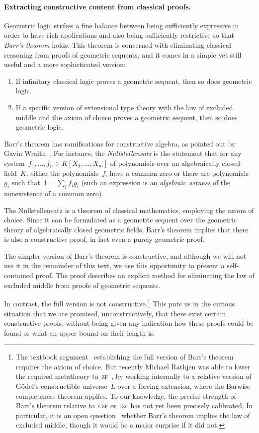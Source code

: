 \documentclass{ws-rv9x6}
\begin{document}
{\paragraph{Extracting constructive content from classical proofs.}\label{par:barr}
Geometric logic strikes a fine balance between being sufficiently expressive in order to
have rich applications and also being sufficiently restrictive so that \emph{Barr's
theorem} holds. This theorem is concerned with eliminating classical reasoning
from proofs of geometric sequents, and it comes in a simple yet still useful
and a more sophisticated version:
\begin{enumerate}
\item If infinitary classical logic proves a geometric sequent, then so does
geometric logic.
\item If a specific version of extensional type theory with the law of excluded
middle and the axiom of choice proves a geometric sequent, then so does
geometric logic.
\end{enumerate}
Barr's theorem has ramifications for constructive algebra, as pointed out by
Gavin Wraith~\cite{wraith:intuitionistic-algebra}.
For instance, the \emph{Nullstellensatz} is the statement that for any
system~$f_1,\ldots,f_n \in K[X_1,\ldots,X_m]$ of polynomials over an
algebraically closed field~$K$, either the polynomials~$f_i$ have a common zero
or there are polynomials~$g_i$ such that~$1 = \sum_i f_i g_i$ (such an
expression is an \emph{algebraic witness} of the nonexistence of a common
zero).

The Nullstellensatz is a theorem of classical mathematics, employing the
axiom of choice. Since it can be formulated as a geometric sequent over the
geometric theory of algebraically closed geometric fields, Barr's theorem
implies that there is also a constructive proof, in fact even a purely
geometric proof.

The simpler version of Barr's theorem is constructive, and although we will not
use it in the remainder of this text, we use this opportunity to present a
self-contained proof. The proof describes an explicit method for eliminating
the law of excluded middle from proofs of geometric sequents.

In contrast, the full version is not constructive.\footnote{%
The textbook argument~\cite[Theorem~7.57]{johnstone:topos-theory} establishing
the full version of Barr's theorem requires the axiom of choice. But recently
Michael Rathjen was able to lower the required metatheory
to~\textsc{zf}~\cite[Remark~4.2]{rathjen:barr}, by working internally to a
relative version of Gödel's constructible universe~$L$ over a forcing
extension, where the Barwise completeness theorem applies. To our knowledge,
the precise strength of Barr's theorem relative to~\textsc{czf} or~\textsc{izf}
has not yet been precisely calibrated. In particular, it is an open
question~\cite{henry:question-barr} whether Barr's theorem implies the law of
excluded middle, though it would be a major surprise if it did not.}
This puts us in the curious situation that we are promised, unconstructively,
that there exist certain constructive proofs, without being given any indication how
these proofs could be found or what an upper bound on their length is.

}
\end{document}
